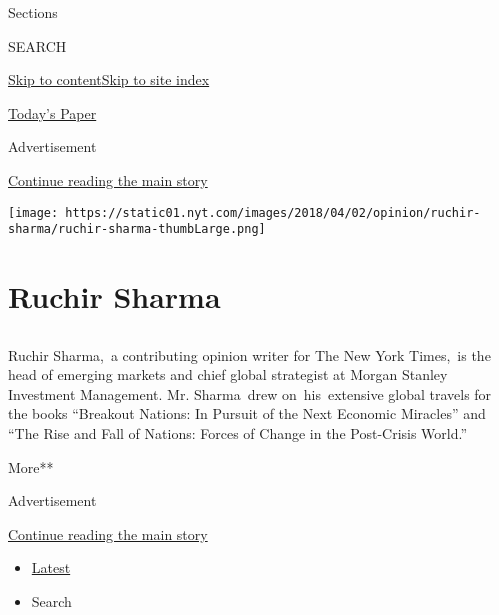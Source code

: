 Sections

SEARCH

\protect\hyperlink{site-content}{Skip to
content}\protect\hyperlink{site-index}{Skip to site index}

\href{https://myaccount.nytimes.com/auth/login?response_type=cookie\&client_id=vi}{}

\href{https://www.nytimes.com/section/todayspaper}{Today's Paper}

Advertisement

\protect\hyperlink{after-top}{Continue reading the main story}

\texttt{[image: https://static01.nyt.com/images/2018/04/02/opinion/ruchir-sharma/ruchir-sharma-thumbLarge.png]}

\hypertarget{ruchir-sharma}{%
\section{Ruchir Sharma}\label{ruchir-sharma}}

\hypertarget{section}{%
\subsection{}\label{section}}

Ruchir Sharma,~a contributing opinion writer for The New York Times,~is
the head of emerging markets and chief global strategist at Morgan
Stanley Investment Management. Mr. Sharma~drew on~his~extensive global
travels for the books ``Breakout Nations: In Pursuit of the Next
Economic Miracles'' and~ ``The Rise and Fall of Nations: Forces of
Change in the Post-Crisis World.''

More**

Advertisement

\protect\hyperlink{after-mid1}{Continue reading the main story}

\begin{itemize}
\tightlist
\item
  \protect\hyperlink{stream-panel}{Latest}
\item
  Search
\end{itemize}

